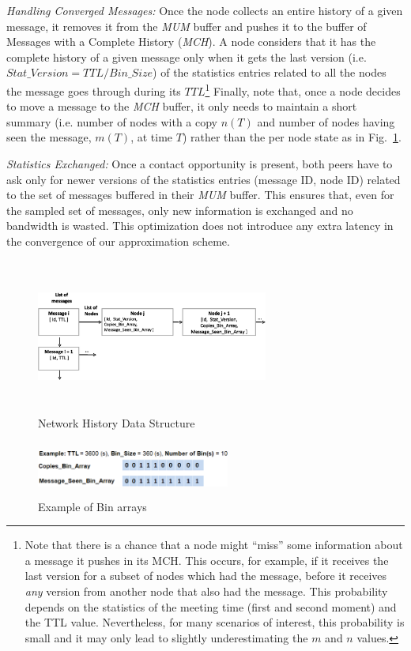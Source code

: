 \emph{Handling Converged Messages:} Once the node collects an entire history of a given message, it removes it from the \emph{MUM} buffer and pushes it to the buffer of Messages with a Complete History (\emph{MCH}). A node considers that it has the complete history of a given message only when it gets the last version (i.e. $Stat\_Version = TTL/Bin\_Size$) of the statistics entries related to all the nodes the message goes through during its $TTL$\footnote{Note that there is a chance that a node might ``miss'' some information about a message it pushes in its MCH. This occurs, for example, if it receives the last version for a subset of nodes which had the message, before it receives \emph{any} version from another node that also had the message. This probability depends on the statistics of the meeting time (first and second moment) and the TTL value. Nevertheless, for many scenarios of interest, this probability is small and it may only lead to slightly underestimating the $m$ and $n$ values.} Finally, note that, once a node decides to move a message to the \emph{MCH} buffer, it only needs to maintain a short summary (i.e. number of nodes with a copy $n(T)$ and number of nodes having seen the message, $m(T)$, at time $T$) rather than the per node state as in  Fig.~\ref{NHM}.

\emph{Statistics Exchanged:} Once a contact opportunity is present, both peers have to ask only for newer versions of the statistics entries (message ID, node ID) related to the set of messages buffered in their \emph{MUM} buffer. This ensures that, even for the sampled set of messages, only new information is exchanged and no bandwidth is wasted. This optimization does not introduce any extra latency in the convergence of our approximation scheme.


\begin{figure}
\centering
\includegraphics[width=3in,height=2in]{Chapitre3/Stat_Matrix.eps}
\caption{Network History Data Structure}
\label{NHM}
\end{figure}
\begin{figure}
\centering
\includegraphics[width=2.5in,height=0.7in]{Chapitre3/Bin_Array.eps}
\caption{Example of Bin arrays}
\label{BA}
\end{figure}

